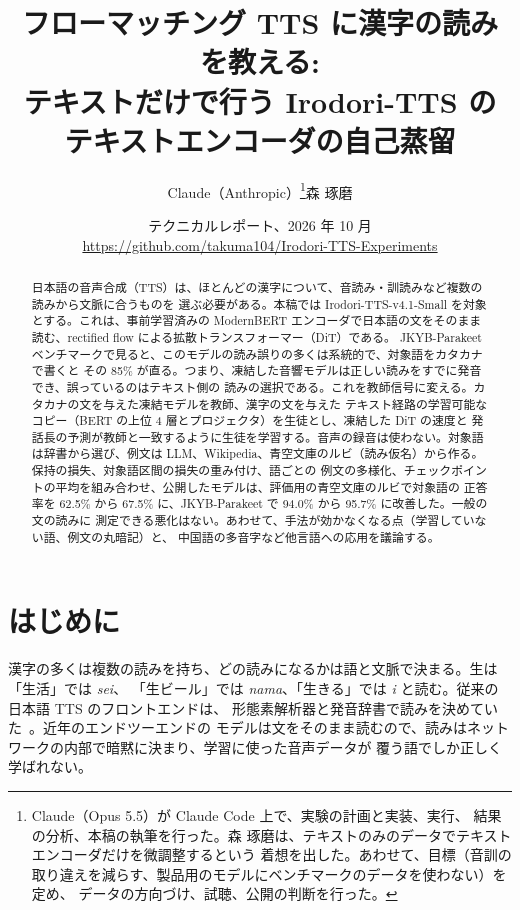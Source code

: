 \documentclass[10pt,a4paper,twocolumn]{article}
\title{\Large\bfseries フローマッチング TTS に漢字の読みを教える:\\
テキストだけで行う Irodori-TTS の\\テキストエンコーダの自己蒸留}
\author{Claude（Anthropic）\thanks{Claude（Opus 5.5）が Claude Code 上で、実験の計画と実装、実行、
結果の分析、本稿の執筆を行った。森 琢磨は、テキストのみのデータでテキストエンコーダだけを微調整するという
着想を出した。あわせて、目標（音訓の取り違えを減らす、製品用のモデルにベンチマークのデータを使わない）を定め、
データの方向づけ、試聴、公開の判断を行った。}\qquad 森 琢磨}
\date{{\small テクニカルレポート、2026 年 10 月}\\
{\small\url{https://github.com/takuma104/Irodori-TTS-Experiments}}}
\begin{document}
\maketitle

\begin{abstract}
日本語の音声合成（TTS）は、ほとんどの漢字について、音読み・訓読みなど複数の読みから文脈に合うものを
選ぶ必要がある。本稿では Irodori-TTS-v4.1-Small を対象とする。これは、事前学習済みの ModernBERT
エンコーダで日本語の文をそのまま読む、rectified flow による拡散トランスフォーマー（DiT）である。
JKYB-Parakeet ベンチマークで見ると、このモデルの読み誤りの多くは系統的で、対象語をカタカナで書くと
その 85\% が直る。つまり、凍結した音響モデルは正しい読みをすでに発音でき、誤っているのはテキスト側の
読みの選択である。これを教師信号に変える。カタカナの文を与えた凍結モデルを教師、漢字の文を与えた
テキスト経路の学習可能なコピー（BERT の上位 4 層とプロジェクタ）を生徒とし、凍結した DiT の速度と
発話長の予測が教師と一致するように生徒を学習する。音声の録音は使わない。対象語は辞書から選び、例文は
LLM、Wikipedia、青空文庫のルビ（読み仮名）から作る。保持の損失、対象語区間の損失の重み付け、語ごとの
例文の多様化、チェックポイントの平均を組み合わせ、公開したモデルは、評価用の青空文庫のルビで対象語の
正答率を 62.5\% から 67.5\% に、JKYB-Parakeet で 94.0\% から 95.7\% に改善した。一般の文の読みに
測定できる悪化はない。あわせて、手法が効かなくなる点（学習していない語、例文の丸暗記）と、
中国語の多音字など他言語への応用を議論する。
\end{abstract}

\section{はじめに}
漢字の多くは複数の読みを持ち、どの読みになるかは語と文脈で決まる。生は「生活」では \emph{sei}、
「生ビール」では \emph{nama}、「生きる」では \emph{i} と読む。従来の日本語 TTS のフロントエンドは、
形態素解析器と発音辞書で読みを決めていた~\cite{mecab,unidic,sudachi}。近年のエンドツーエンドの
モデルは文をそのまま読むので、読みはネットワークの内部で暗黙に決まり、学習に使った音声データが
覆う語でしか正しく学ばれない。
\end{document}
